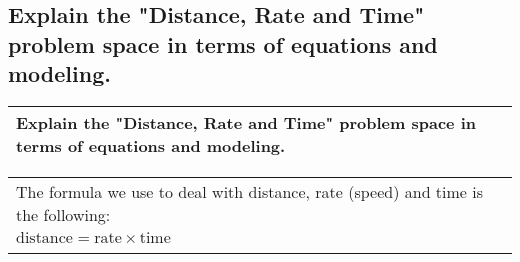 \subsection{
        Explain the "Distance, Rate and Time" problem space in terms of
    equations and modeling.}
\begin{small}
    \begin{tabularx}{1\textwidth}{
            p{}
        }
        \toprule
        Explain the "Distance, Rate and Time" problem space in terms of
        equations and modeling.
        \\
        \bottomrule
    \end{tabularx}
\end{small}
\begin{small}
    \begin{tabularx}{1\textwidth}{
            p{}
        }
        \toprule
        The formula we use to deal with distance, rate (speed) and time is the
        following: \\
        $ \text{distance} = \text{rate} \times \text{time} $ \\
        \\
        \bottomrule
    \end{tabularx}
\end{small}
